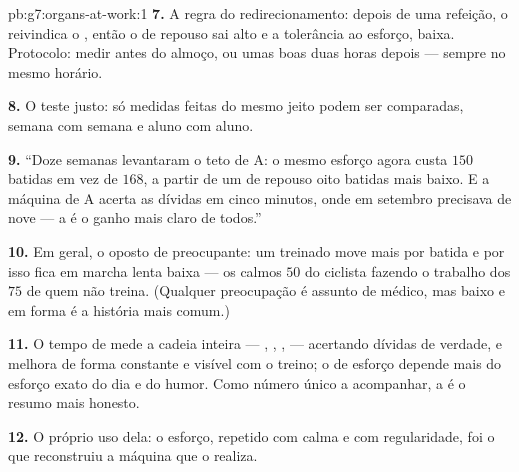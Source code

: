\begin{solution}{pb:g7:organs-at-work:1}
\textbf{7.} A regra do redirecionamento: depois de uma refeição, o
 reivindica o , então o  de repouso sai alto
e a tolerância ao esforço, baixa. Protocolo: medir antes do almoço, ou
umas boas duas horas depois --- sempre no mesmo horário.

\textbf{8.} O teste justo: só medidas feitas do mesmo jeito podem ser
comparadas, semana com semana e aluno com aluno.

\textbf{9.} ``Doze semanas levantaram o teto de A: o mesmo esforço
agora custa $150$ batidas em vez de $168$, a partir de um  de
repouso oito batidas mais baixo. E a máquina de A acerta as dívidas em
cinco minutos, onde em setembro precisava de nove --- a  é o
ganho mais claro de todos.''

\textbf{10.} Em geral, o oposto de preocupante: um  treinado
move mais  por batida e por isso fica em marcha lenta baixa ---
os calmos $50$ do ciclista fazendo o trabalho dos $75$ de quem não
treina. (Qualquer preocupação é assunto de médico, mas baixo e em
forma é a história mais comum.)

\textbf{11.} O tempo de  mede a cadeia inteira --- ,
, ,  --- acertando dívidas de verdade, e melhora de
forma constante e visível com o treino; o  de esforço depende
mais do esforço exato do dia e do humor. Como número único a
acompanhar, a  é o resumo mais honesto.

\textbf{12.} O próprio uso dela: o esforço, repetido com calma e com
regularidade, foi o que reconstruiu a máquina que o realiza.
\end{solution}
